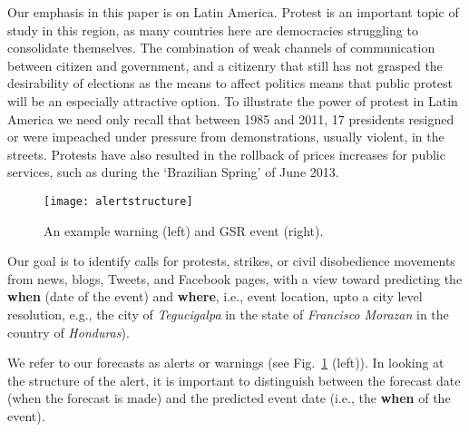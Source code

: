 Our emphasis in this paper is on Latin America.
Protest is an important topic of study in this
region, as many countries here are democracies struggling to consolidate themselves.
The combination of weak channels of communication between citizen and government, and a citizenry that still 
has not grasped the desirability of elections as the means to affect politics means that public protest 
will be an especially attractive option. To illustrate the power of protest in Latin America we need 
only recall that between 1985 and 2011, 17 presidents resigned or were impeached under pressure from 
demonstrations, usually violent, in the streets. Protests have also resulted 
in the rollback of prices increases for public services, such as during the `Brazilian Spring' of June 2013.

\begin{figure}
    \texttt{[image: alertstructure]}
    \caption{An example warning (left) and GSR event (right).}
    \label{fig:alertstructure}
\end{figure}

Our goal is to identify calls for protests, strikes, or civil disobedience movements from news, blogs, Tweets, and Facebook
pages, with a view toward predicting the {\bf when} (date of the event) and {\bf where}, i.e.,
event location, upto a city level resolution, e.g., 
the city of {\it Tegucigalpa} in the state of {\it Francisco Morazan} in the country of {\it Honduras}).
\iffalse
In addition we seek to forecast the `why' and `who' of the protest.
The {\bf why} (or event type)
captures the main objective or reason for a civil unrest event,
and is meant to come from 7 broad classes (e.g., `Employment \& Wages',
`Housing', `Energy \& Resources' etc.) each of which is further categorized into
whether the event is forecast to be violent or not.
Finally, the {\bf who} (or population)
denotes common categories of human populations
used in event coding~\cite{philschrodt}
such as
Business, Ethnic, Legal (e.g. judges or lawyers), Education (e.g. teachers or students or parents of students), Religious (e.g. clergy), Medical (e.g., doctors or nurses), Media, Labor, Refugees/Displaced, Agricultural (e.g. farmers,
or just General Population. 
\fi
We refer to our forecasts as alerts or warnings (see Fig.~\ref{fig:alertstructure} (left)).
In looking at the structure of the alert, it is important to distinguish between the forecast date (when the forecast is made)
and the predicted event date (i.e., the {\bf when} of the event).

